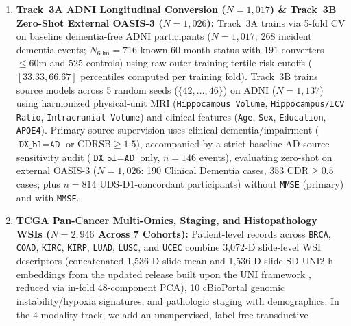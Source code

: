 \documentclass[10pt,twocolumn]{article}
\begin{document}
\begin{enumerate}[leftmargin=1.4em,itemsep=1pt,topsep=2pt]
\[    \sum_{j \in \mathcal{D}_f^{\text{cal}}}
    \Big[\mathbb{I}(s_{f,j} < s) + \mathbb{I}(s_{f,j} \le s)\Big].
    \]
    Here $\mathcal{D}_f^{\text{cal}}$ contains fold-$f$ outer-training discordant in-sample
    predictions, with discordance defined using fold-$f$ training medians; fewer than five
    discordant cases trigger a fallback to the full training fold. Percentiles are mapped
    out-of-fold to held-out Cohort~1 and non-overlapping Cohort~2 discordant patients, then
    sorted across the pooled $n=198$ with raw-score tie-breaking.
    \item \textbf{Track~3A ADNI Longitudinal Conversion ($N=1,017$) \& Track~3B Zero-Shot
    External OASIS-3 ($N=1,026$):} Track~3A trains via 5-fold CV on baseline dementia-free ADNI
    participants ($N=1,017$, 268 incident dementia events; $N_{60\text{m}}=716$ known 60-month
    status with $191$ converters $\le 60$m and $525$ controls) using raw outer-training tertile
    risk cutoffs ($[33.33, 66.67]$ percentiles computed per training fold). Track~3B trains
    source models across 5 random seeds ($\{42,\dots,46\}$) on ADNI ($N=1,137$) using
    harmonized physical-unit MRI (\texttt{Hippocampus Volume}, \texttt{Hippocampus/ICV Ratio},
    \texttt{Intracranial Volume}) and clinical features (\texttt{Age}, \texttt{Sex},
    \texttt{Education}, \texttt{APOE4}). Primary source supervision uses clinical
    dementia/impairment ($\texttt{DX\_bl}=\texttt{AD}$ or $\text{CDRSB}\ge 1.5$), accompanied
    by a strict baseline-AD source sensitivity audit ($\texttt{DX\_bl}=\texttt{AD}$ only,
    $n=146$ events), evaluating zero-shot on external OASIS-3 ($N=1,026$: 190 Clinical Dementia
    cases, 353 $\text{CDR}\ge 0.5$ cases; plus $n=814$ UDS-D1-concordant participants)
    \cite{lamontagne2019oasis} without \texttt{MMSE} (primary) and with \texttt{MMSE}.
    \item \textbf{TCGA Pan-Cancer Multi-Omics, Staging, and Histopathology WSIs ($N=2,946$
    Across 7 Cohorts):} Patient-level records across \texttt{BRCA}, \texttt{COAD},
    \texttt{KIRC}, \texttt{KIRP}, \texttt{LUAD}, \texttt{LUSC}, and \texttt{UCEC} combine
    3,072-D slide-level WSI descriptors (concatenated 1,536-D slide-mean and 1,536-D slide-SD
    UNI2-h embeddings from the updated release built upon the UNI framework
    \cite{chen2024uni,mahmoodlab2025uni2h},
    reduced via in-fold 48-component PCA), 10 cBioPortal
    \cite{cerami2012cbioportal} genomic instability/hypoxia signatures, and pathologic staging
    with demographics. In the 4-modality track, we add an unsupervised, label-free transductive

\end{enumerate}
\end{document}
